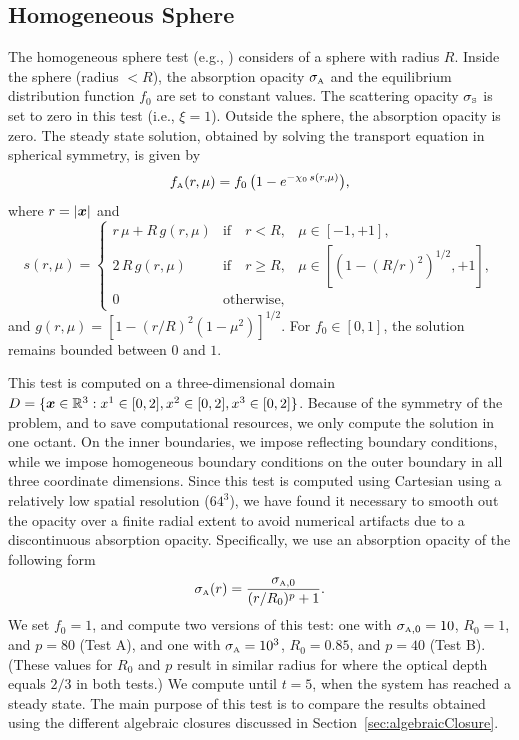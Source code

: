 \clearpage

\subsection{Homogeneous Sphere}

The homogeneous sphere test (e.g., \cite{smit_etal_1997}) considers of a sphere with radius $R$.  
Inside the sphere (radius $<R$), the absorption opacity $\sigma_{\mbox{\tiny A}}$ and the equilibrium distribution function $f_{0}$ are set to constant values.  
The scattering opacity $\sigma_{\mbox{\tiny S}}$ is set to zero in this test (i.e., $\xi=1$).  
Outside the sphere, the absorption opacity is zero.  
The steady state solution, obtained by solving the transport equation in spherical symmetry, is given by
\begin{equation}
  f_{\mbox{\tiny A}}(r,\mu)=f_{0}\,\big(1-e^{-\chi_{0}\,s(r,\mu)}\big),
  \label{eq:distributionHomogeneousSphere}
\end{equation}
where $r=|\boldsymbol{x}|$ and
\begin{equation}
  s(r,\mu)
  =\left\{
  \begin{array}{lll}
    r\,\mu+R\,g(r,\mu) & \mbox{if}\quad r<R, & \mu\in[-1,+1], \\
    2\,R\,g(r,\mu) & \mbox{if}\quad r \ge R, & \mu\in[(1-(R/r)^{2})^{1/2},+1], \\
    0 & \mbox{otherwise},
  \end{array}
  \right.
\end{equation}
and $g(r,\mu)=[1-(r/R)^{2}(1-\mu^{2})]^{1/2}$.  
For $f_{0}\in[0,1]$, the solution remains bounded between $0$ and $1$.  

This test is computed on a three-dimensional domain $D=\{\boldsymbol{x}\in\mathbb{R}^{3}:x^{1}\in[0,2], x^{2}\in[0,2], x^{3}\in[0,2]\}$.  
Because of the symmetry of the problem, and to save computational resources, we only compute the solution in one octant.  
On the inner boundaries, we impose reflecting boundary conditions, while we impose homogeneous boundary conditions on the outer boundary in all three coordinate dimensions.  
Since this test is computed using Cartesian using a relatively low spatial resolution ($64^{3}$), we have found it necessary to smooth out the opacity over a finite radial extent to avoid numerical artifacts due to a discontinuous absorption opacity.  
Specifically, we use an absorption opacity of the following form
\begin{equation}
  \sigma_{\mbox{\tiny A}}(r)=\frac{\sigma_{\mbox{\tiny A},0}}{(r/R_{0})^{p}+1}.  
\end{equation}
We set $f_{0}=1$, and compute two versions of this test: one with $\sigma_{\mbox{\tiny A},0}=10$, $R_{0}=1$, and $p=80$ (Test A), and one with $\sigma_{\mbox{\tiny A}}=10^{3}$, $R_{0}=0.85$, and $p=40$ (Test B).  
(These values for $R_{0}$ and $p$ result in similar radius for where the optical depth equals $2/3$ in both tests.)
We compute until $t=5$, when the system has reached a steady state.  
The main purpose of this test is to compare the results obtained using the different algebraic closures discussed in Section~\ref{sec:algebraicClosure}.  

